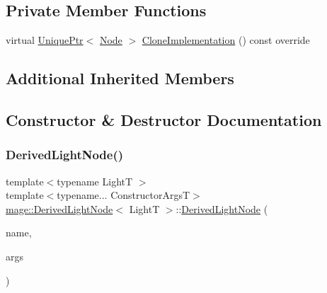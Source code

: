 \subsection*{Private Member Functions}
\begin{DoxyCompactItemize}
\item 
virtual \hyperlink{namespacemage_a8c307fbcc33bce9b7f2aa4c26c3b95cf}{Unique\+Ptr}$<$ \hyperlink{classmage_1_1_node}{Node} $>$ \hyperlink{classmage_1_1_derived_light_node_acf8858989780bf45a45c55a7c5564314}{Clone\+Implementation} () const override
\end{DoxyCompactItemize}
\subsection*{Additional Inherited Members}


\subsection{Constructor \& Destructor Documentation}
\hypertarget{classmage_1_1_derived_light_node_a64003a60d92c245c8ad247bb16724852}{}\label{classmage_1_1_derived_light_node_a64003a60d92c245c8ad247bb16724852} 
\subsubsection{\texorpdfstring{Derived\+Light\+Node()}{DerivedLightNode()}\hspace{0.1cm}{\footnotesize\ttfamily [1/4]}}
{\footnotesize\ttfamily template$<$typename LightT $>$ \\
template$<$typename... Constructor\+ArgsT$>$ \\
\hyperlink{classmage_1_1_derived_light_node}{mage\+::\+Derived\+Light\+Node}$<$ LightT $>$\+::\hyperlink{classmage_1_1_derived_light_node}{Derived\+Light\+Node} (\begin{DoxyParamCaption}\item[{const string \&}]{name,  }\item[{Constructor\+ArgsT \&\&...}]{args }\end{DoxyParamCaption})\hspace{0.3cm}{\ttfamily [explicit]}}

\hypertarget{classmage_1_1_derived_light_node_ab3e68ce3299581459843e8ad12f18464}{}\label{classmage_1_1_derived_light_node_ab3e68ce3299581459843e8ad12f18464} 
